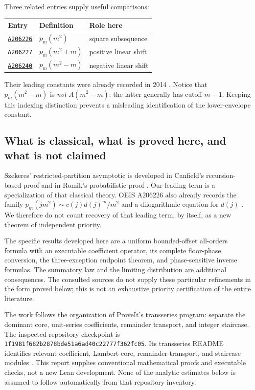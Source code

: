 \documentclass[11pt,a4paper]{article}
\numberwithin{equation}{section}
\theoremstyle{definition}
\theoremstyle{remark}
\newcommand{\oeis}[1]{\href{https://oeis.org/#1}{\texttt{#1}}}
\begin{document}
Three related entries supply useful comparisons:
\begin{center}
\begin{tabular}{lll}
\toprule
Entry & Definition & Role here\\
\midrule
\oeis{A206226} & $p_m(m^2)$ & square subsequence\\
\oeis{A206227} & $p_m(m^2+m)$ & positive linear shift\\
\oeis{A206240} & $p_m(m^2-m)$ & negative linear shift\\
\bottomrule
\end{tabular}
\end{center}
Their leading constants were already recorded in 2014
\cite{oeisSquare,oeisPlus,oeisMinus}. Notice that
$p_m(m^2-m)$ is \emph{not} $A(m^2-m)$: the latter generally has cutoff
$m-1$. Keeping this indexing distinction prevents a misleading
identification of the lower-envelope constant.

\subsection{What is classical, what is proved here, and what is not claimed}
Szekeres' restricted-partition asymptotic is developed in Canfield's
recursion-based proof and in Romik's probabilistic proof
\cite{canfield,romik}. Our leading term is a specialization of that
classical theory. OEIS A206226 also already records the family
$p_m(jm^2)\sim c(j)d(j)^m/m^2$ and a dilogarithmic equation for $d(j)$
\cite{oeisSquare}. We therefore do not count recovery of that leading
term, by itself, as a new theorem of independent priority.

The specific results developed here are a uniform bounded-offset
all-orders formula with an executable coefficient operator, its complete
floor-phase conversion, the three-exception endpoint theorem, and
phase-sensitive inverse formulas. The summatory law and the limiting
distribution are additional consequences. The consulted sources do not
supply these particular refinements in the form proved below; this is
not an exhaustive priority certification of the entire literature.

The work follows the organization of ProveIt's transseries program:
separate the dominant core, unit-series coefficients, remainder
transport, and integer staircase. The inspected repository checkpoint is
\nolinkurl{1f1981f682b2878bde51a6ad40c22777f362fc05}. Its transseries README
identifies relevant coefficient, Lambert-core, remainder-transport, and
staircase modules \cite{proveit}. This report supplies conventional
mathematical proofs and executable checks, not a new Lean development.
None of the analytic estimates below is assumed to follow automatically
from that repository inventory.
\end{document}
